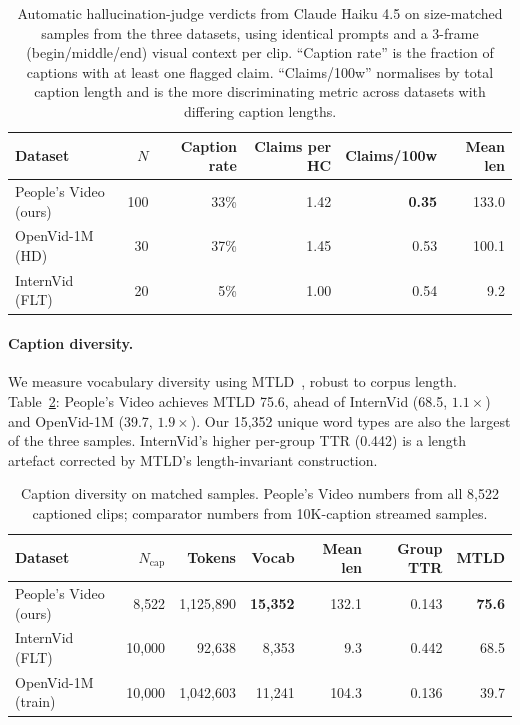 \documentclass{article}
\begin{document}
\begin{table}[t]
\centering
\caption{Automatic hallucination-judge verdicts from Claude Haiku 4.5 on size-matched samples from the three datasets, using identical prompts and a 3-frame (begin/middle/end) visual context per clip. ``Caption rate'' is the fraction of captions with at least one flagged claim. ``Claims/100w'' normalises by total caption length and is the more discriminating metric across datasets with differing caption lengths.}
\label{tab:hallucination_rate}
\begin{tabular}{lrrrrr}
\toprule
Dataset & $N$ & Caption rate & Claims per HC & Claims/100w & Mean len \\
\midrule
People's Video (ours) & 100 & 33\%         & 1.42 & \textbf{0.35} & 133.0 \\
OpenVid-1M (HD)       & 30  & 37\%         & 1.45 & 0.53          & 100.1 \\
InternVid (FLT)       & 20  & \phantom{0}5\% & 1.00 & 0.54          & \phantom{00}9.2 \\
\bottomrule
\end{tabular}
\end{table}

\paragraph{Caption diversity.}
We measure vocabulary diversity using MTLD~\cite{mccarthy2010mtld}, robust to corpus length. Table~\ref{tab:caption_diversity}: People's Video achieves MTLD 75.6, ahead of InternVid (68.5, $1.1\times$) and OpenVid-1M (39.7, $1.9\times$). Our 15{,}352 unique word types are also the largest of the three samples. InternVid's higher per-group TTR (0.442) is a length artefact corrected by MTLD's length-invariant construction.

\begin{table}[t]
\centering
\caption{Caption diversity on matched samples. People's Video numbers from all 8{,}522 captioned clips; comparator numbers from 10K-caption streamed samples.}
\label{tab:caption_diversity}
\begin{tabular}{lrrrrrr}
\toprule
Dataset & $N_{\text{cap}}$ & Tokens & Vocab & Mean len & Group TTR & MTLD \\
\midrule
People's Video (ours) & 8{,}522  & 1{,}125{,}890 & \textbf{15{,}352} & 132.1 & 0.143 & \textbf{75.6} \\
InternVid (FLT)       & 10{,}000 & 92{,}638      & 8{,}353  & 9.3   & 0.442 & 68.5 \\
OpenVid-1M (train)    & 10{,}000 & 1{,}042{,}603 & 11{,}241 & 104.3 & 0.136 & 39.7 \\
\bottomrule
\end{tabular}
\end{table}
\end{document}
